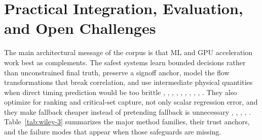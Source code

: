 \documentclass[num-refs]{wiley-article}
\begin{document}
    \section{Practical Integration, Evaluation, and Open Challenges}

    The main architectural message of the corpus is that ML and GPU acceleration work best as complements. The safest systems learn bounded decisions rather than unconstrained final truth, preserve a signoff anchor, model the flow transformations that break correlation, and use intermediate physical quantities when direct timing prediction would be too brittle \cite{ref1}, \cite{ref3}, \cite{ref8}, \cite{ref9}, \cite{ref10}, \cite{ref16}, \cite{ref17}, \cite{ref25}, \cite{ref28}, \cite{ref29}. They also optimize for ranking and critical-set capture, not only scalar regression error, and they make fallback cheaper instead of pretending fallback is unnecessary \cite{ref21}, \cite{ref22}, \cite{ref23}, \cite{ref37}, \cite{ref40}. Table~\ref{tab:wiley-3} summarizes the major method families, their trust anchors, and the failure modes that appear when those safeguards are missing.
\end{document}
